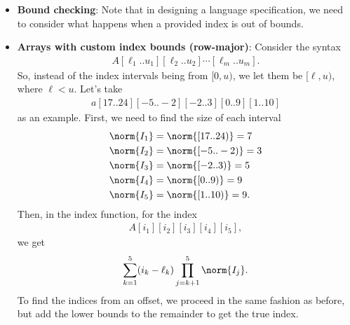 \documentclass{report}
\begin{document}
\begin{itemize}
\begin{align*}
                7612 / 8 &= 951\; \text{r } 4 \\
                951 / 3 &= 317\; \text{r } 0 \\
                 317/ 5 &= 63\; \text{r } 2 \\
                 63/ 10 &= 6\; \text{r } 3 \\
                 6/ 7 &= 0\; \text{r } 6
            .\end{align*}
            Thus, the indices are indeed
            \begin{align*}
                A[6][3][2][0][4]
            .\end{align*}
        \item \textbf{Bound checking}: Note that in designing a language specification, we need to consider what happens when a provided index is out of bounds.
        \item \textbf{Arrays with custom index bounds (row-major)}: Consider the syntax
            \begin{align*}
                A[\ell_{1}..u_{1}][\ell_{2}..u_{2}]\cdots[\ell_{m}..u_{m}]
            .\end{align*}
            So, instead of the index intervals being from $[0,u)$, we let them be $[\ell, u)$, where $\ell < u$.
            \bigbreak \noindent 
            Let's take 
            \begin{align*}
                a[17..24][-5..-2][-2..3][0..9][1..10]
            \end{align*}
            as an example. First, we need to find the size of each interval
            \begin{align*}
                \norm{I_{1}} &= \norm{[17..24)} = 7 \\
                \norm{I_{2}} &= \norm{[-5..-2)} = 3 \\
                \norm{I_{3}} &= \norm{[-2..3)} = 5 \\
                \norm{I_{4}} &= \norm{[0..9)} = 9 \\
                \norm{I_{5}} &= \norm{[1..10)} = 9 
            .\end{align*}
            Then, in the index function, for the index
            \begin{align*}
                A[i_{1}][i_{2}][i_{3}][i_{4}][i_{5}]
            ,\end{align*}
            we get
            \begin{align*}
                \sum_{k=1}^{5}(i_{k} - \ell_{k})\prod_{j=k+1}^{5}\norm{I_{j}}
            .\end{align*}
            To find the indices from an offset, we proceed in the same fashion as before, but add the lower bounds to the remainder to get the true index.



        \end{itemize}
\end{document}
